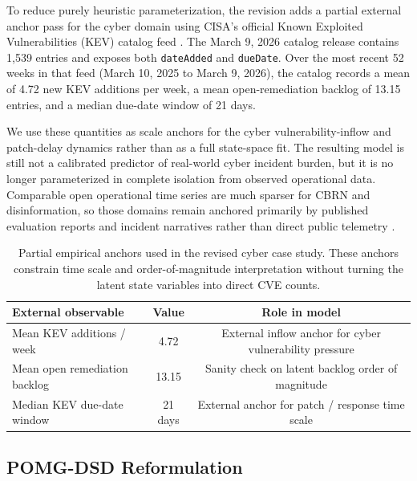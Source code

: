 \documentclass[11pt]{article}
\begin{document}
To reduce purely heuristic parameterization, the revision adds a partial external anchor pass for the cyber domain using CISA's official Known Exploited Vulnerabilities (KEV) catalog feed \citep{cisa2026kev}. The March 9, 2026 catalog release contains 1,539 entries and exposes both \texttt{dateAdded} and \texttt{dueDate}. Over the most recent 52 weeks in that feed (March 10, 2025 to March 9, 2026), the catalog records a mean of 4.72 new KEV additions per week, a mean open-remediation backlog of 13.15 entries, and a median due-date window of 21 days.

We use these quantities as scale anchors for the cyber vulnerability-inflow and patch-delay dynamics rather than as a full state-space fit. The resulting model is still not a calibrated predictor of real-world cyber incident burden, but it is no longer parameterized in complete isolation from observed operational data. Comparable open operational time series are much sparser for CBRN and disinformation, so those domains remain anchored primarily by published evaluation reports and incident narratives rather than direct public telemetry \citep{shevlane2023,weidinger2023,iaisr2025}.

\begin{table}[t]
\centering
\caption{Partial empirical anchors used in the revised cyber case study. These anchors constrain time scale and order-of-magnitude interpretation without turning the latent state variables into direct CVE counts.}
\label{tab:empirical_anchors}
\small
\begin{tabular}{@{}lcc@{}}
\toprule
\textbf{External observable} & \textbf{Value} & \textbf{Role in model} \\
\midrule
Mean KEV additions / week & 4.72 & External inflow anchor for cyber vulnerability pressure \\
Mean open remediation backlog & 13.15 & Sanity check on latent backlog order of magnitude \\
Median KEV due-date window & 21 days & External anchor for patch / response time scale \\
\bottomrule
\end{tabular}
\end{table}

\subsection{POMG-DSD Reformulation}
\label{sec:pomg_dsd}
\end{document}
